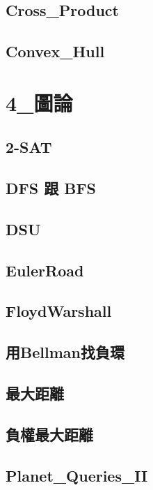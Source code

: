 \subsection{Cross_Product} 

\subsection{Convex_Hull} 


\section{4_圖論}
\subsection{2-SAT} 

\subsection{DFS 跟 BFS} 

\subsection{DSU} 

\subsection{EulerRoad} 

\subsection{FloydWarshall} 

\subsection{用Bellman找負環} 

\subsection{最大距離} 

\subsection{負權最大距離} 

\subsection{Planet_Queries_II} 

